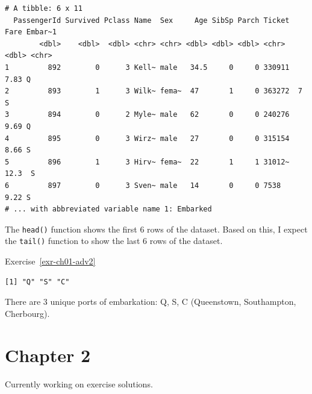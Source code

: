 \documentclass[
  letterpaper,
  DIV=11,
  numbers=noendperiod]{scrreprt}
\newenvironment{Shaded}{\begin{snugshade}}{\end{snugshade}}
\newcommand{\FunctionTok}[1]{\textcolor[rgb]{0.28,0.35,0.67}{#1}}
\newcommand{\NormalTok}[1]{\textcolor[rgb]{0.00,0.23,0.31}{#1}}
\newcommand{\SpecialCharTok}[1]{\textcolor[rgb]{0.37,0.37,0.37}{#1}}
\theoremstyle{definition}
\theoremstyle{remark}
\begin{document}
\begin{verbatim}
# A tibble: 6 x 11
  PassengerId Survived Pclass Name  Sex     Age SibSp Parch Ticket  Fare Embar~1
        <dbl>    <dbl>  <dbl> <chr> <chr> <dbl> <dbl> <dbl> <chr>  <dbl> <chr>  
1         892        0      3 Kell~ male   34.5     0     0 330911  7.83 Q      
2         893        1      3 Wilk~ fema~  47       1     0 363272  7    S      
3         894        0      2 Myle~ male   62       0     0 240276  9.69 Q      
4         895        0      3 Wirz~ male   27       0     0 315154  8.66 S      
5         896        1      3 Hirv~ fema~  22       1     1 31012~ 12.3  S      
6         897        0      3 Sven~ male   14       0     0 7538    9.22 S      
# ... with abbreviated variable name 1: Embarked
\end{verbatim}

The \texttt{head()} function shows the first 6 rows of the dataset.
Based on this, I expect the \texttt{tail()} function to show the last 6
rows of the dataset.

Exercise~\ref{exr-ch01-adv2}

\begin{Shaded}
\end{Shaded}

\begin{verbatim}
[1] "Q" "S" "C"
\end{verbatim}

There are 3 unique ports of embarkation: Q, S, C (Queenstown,
Southampton, Cherbourg).

\hypertarget{sec-ex02-sol}{%
\section{Chapter 2}\label{sec-ex02-sol}}

\begin{tcolorbox}[enhanced jigsaw, coltitle=black, toprule=.15mm, bottomtitle=1mm, breakable, leftrule=.75mm, title=\textcolor{quarto-callout-caution-color}{\faFire}\hspace{0.5em}{Under Construction}, opacitybacktitle=0.6, colback=white, rightrule=.15mm, opacityback=0, toptitle=1mm, colbacktitle=quarto-callout-caution-color!10!white, colframe=quarto-callout-caution-color-frame, titlerule=0mm, arc=.35mm, bottomrule=.15mm, left=2mm]
Currently working on exercise solutions.
\end{tcolorbox}
\end{document}
